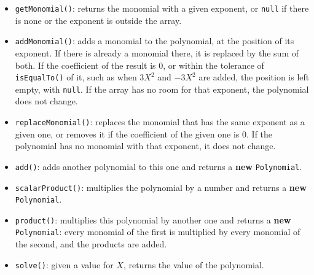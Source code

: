 \begin{itemize}
\begin{itemize}
\begin{itemize}
                    \item A constructor that receives an array of coefficients, where the position of each coefficient is its exponent. A coefficient of 0 gives no monomial.

                    \item A constructor that receives an array of \texttt{Monomial} objects, in any order. The array of the polynomial must have room for the highest exponent among them.

                \end{itemize}

            \item \texttt{getMonomial()}: returns the monomial with a given exponent, or \texttt{null} if there is none or the exponent is outside the array.

            \item \texttt{addMonomial()}: adds a monomial to the polynomial, at the position of its exponent. If there is already a monomial there, it is replaced by the sum of both. If the coefficient of the result is 0, or within the tolerance of \texttt{isEqualTo()} of it, such as when \(3X^2\) and \(-3X^2\) are added, the position is left empty, with \texttt{null}. If the array has no room for that exponent, the polynomial does not change.

            \item \texttt{replaceMonomial()}: replaces the monomial that has the same exponent as a given one, or removes it if the coefficient of the given one is 0. If the polynomial has no monomial with that exponent, it does not change.

            \item \texttt{add()}: adds another polynomial to this one and returns a \textbf{new} \texttt{Polynomial}.

            \item \texttt{scalarProduct()}: multiplies the polynomial by a number and returns a \textbf{new} \texttt{Polynomial}.

            \item \texttt{product()}: multiplies this polynomial by another one and returns a \textbf{new} \texttt{Polynomial}: every monomial of the first is multiplied by every monomial of the second, and the products are added.

            \item \texttt{solve()}: given a value for \(X\), returns the value of the polynomial.


\end{itemize}
\end{itemize}
